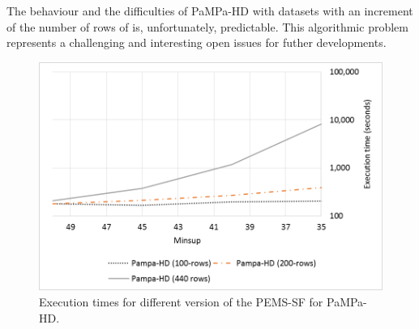 The behaviour and the difficulties of PaMPa-HD with datasets with an increment of the number of rows of is, unfortunately, predictable. This algorithmic problem represents a challenging and interesting open issues for futher developments.
\begin{figure}[!t]
\includegraphics[width=5in]{immagini_extension/pampa_pems_confronto.png}
\caption{Execution times for different version of the PEMS-SF for PaMPa-HD.}
\label{pampa_pems_confronto}
\end{figure}

%


